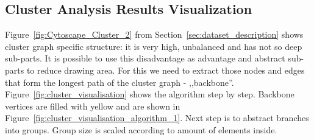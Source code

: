 \subsection{Cluster Analysis Results Visualization}
\label{sec:cluster}

Figure~\ref{fig:Cytoscape_Cluster_2} from Section~\ref{sec:dataset_description} shows cluster graph specific structure: it is very high, unbalanced and has not so deep sub-parts.
It is possible to use this disadvantage as advantage and abstract sub-parts to reduce drawing area.
For this we need to extract those nodes and edges that form the longest path of the cluster graph - ,,backbone''. Figure~\ref{fig:cluster_visualisation} shows the algorithm step by step.
Backbone vertices are filled with yellow and are shown in Figure~\ref{fig:cluster_visualisation_algorithm_1}.
Next step is to abstract branches into groups. Group size is scaled according to amount of elements inside.

